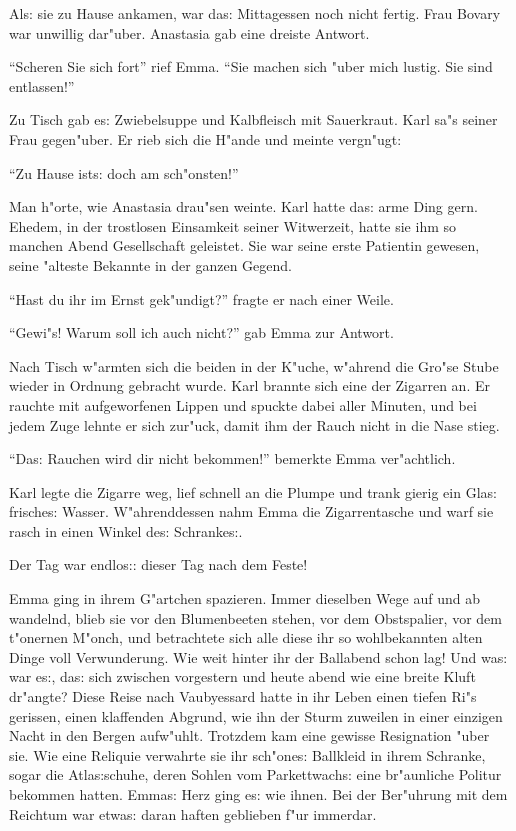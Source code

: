 \documentclass[oneside,12pt]{book}
\newcommand{\s}{s:}%
\begin{document}
Al{\s} sie zu Hause ankamen, war da{\s} Mittagessen noch nicht
fertig. Frau Bovary war unwillig dar"uber. Anastasia gab eine
dreiste Antwort.

"`Scheren Sie sich fort"' rief Emma. "`Sie machen sich "uber mich
lustig. Sie sind entlassen!"'

Zu Tisch gab e{\s} Zwiebelsuppe und Kalbfleisch mit Sauerkraut.
Karl sa"s seiner Frau gegen"uber. Er rieb sich die H"ande und
meinte vergn"ugt:

"`Zu Hause ist{\s} doch am sch"onsten!"'

Man h"orte, wie Anastasia drau"sen weinte. Karl hatte da{\s} arme
Ding gern. Ehedem, in der trostlosen Einsamkeit seiner Witwerzeit,
hatte sie ihm so manchen Abend Gesellschaft geleistet. Sie war
seine erste Patientin gewesen, seine "alteste Bekannte in der
ganzen Gegend.

"`Hast du ihr im Ernst gek"undigt?"' fragte er nach einer Weile.

"`Gewi"s! Warum soll ich auch nicht?"' gab Emma zur Antwort.

Nach Tisch w"armten sich die beiden in der K"uche, w"ahrend die
Gro"se Stube wieder in Ordnung gebracht wurde. Karl brannte sich
eine der Zigarren an. Er rauchte mit aufgeworfenen Lippen und
spuckte dabei aller Minuten, und bei jedem Zuge lehnte er sich
zur"uck, damit ihm der Rauch nicht in die Nase stieg.

"`Da{\s} Rauchen wird dir nicht bekommen!"' bemerkte Emma
ver"achtlich.

Karl legte die Zigarre weg, lief schnell an die Plumpe und trank
gierig ein Gla{\s} frische{\s} Wasser. W"ahrenddessen nahm Emma
die Zigarrentasche und warf sie rasch in einen Winkel de{\s}
Schranke{\s}.

Der Tag war endlo{\s}: dieser Tag nach dem Feste!

Emma ging in ihrem G"artchen spazieren. Immer dieselben Wege auf
und ab wandelnd, blieb sie vor den Blumenbeeten stehen, vor dem
Obstspalier, vor dem t"onernen M"onch, und betrachtete sich alle
diese ihr so wohlbekannten alten Dinge voll Verwunderung. Wie weit
hinter ihr der Ballabend schon lag! Und wa{\s} war e{\s}, da{\s}
sich zwischen vorgestern und heute abend wie eine breite Kluft
dr"angte? Diese Reise nach Vaubyessard hatte in ihr Leben einen
tiefen Ri"s gerissen, einen klaffenden Abgrund, wie ihn der Sturm
zuweilen in einer einzigen Nacht in den Bergen aufw"uhlt. Trotzdem
kam eine gewisse Resignation "uber sie. Wie eine Reliquie
verwahrte sie ihr sch"one{\s} Ballkleid in ihrem Schranke, sogar
die Atla{\s}schuhe, deren Sohlen vom Parkettwach{\s} eine
br"aunliche Politur bekommen hatten. Emma{\s} Herz ging e{\s} wie
ihnen. Bei der Ber"uhrung mit dem Reichtum war etwa{\s} daran
haften geblieben f"ur immerdar.
\end{document}
